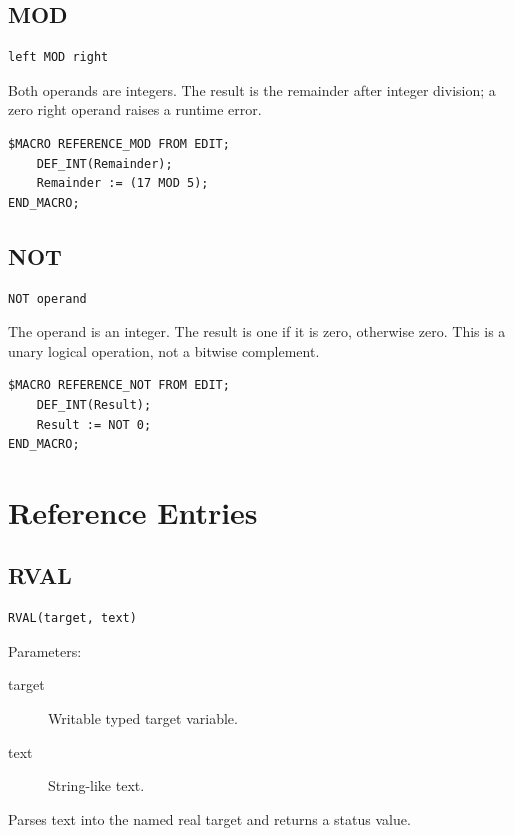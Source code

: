 \documentclass[a4paper,10pt,twoside,openany]{book}
\begin{document}
\label{prim:operator-mod}
\subsection*{MOD}
\begin{verbatim}
left MOD right
\end{verbatim}
Both operands are integers. The result is the remainder after integer
division; a zero right operand raises a runtime error.
\begin{verbatim}
$MACRO REFERENCE_MOD FROM EDIT;
    DEF_INT(Remainder);
    Remainder := (17 MOD 5);
END_MACRO;
\end{verbatim}

\label{prim:operator-not}
\subsection*{NOT}
\begin{verbatim}
NOT operand
\end{verbatim}
The operand is an integer. The result is one if it is zero, otherwise zero.
This is a unary logical operation, not a bitwise complement.
\begin{verbatim}
$MACRO REFERENCE_NOT FROM EDIT;
    DEF_INT(Result);
    Result := NOT 0;
END_MACRO;
\end{verbatim}

\section{Reference Entries}

\label{prim:intrinsic-rval}
\subsection*{RVAL}
\begin{verbatim}
RVAL(target, text)
\end{verbatim}
Parameters:
\begin{description}
\item[target] Writable typed target variable.
\item[text] String-like text.
\end{description}

Parses text into the named real target and returns a status value.
\end{document}
